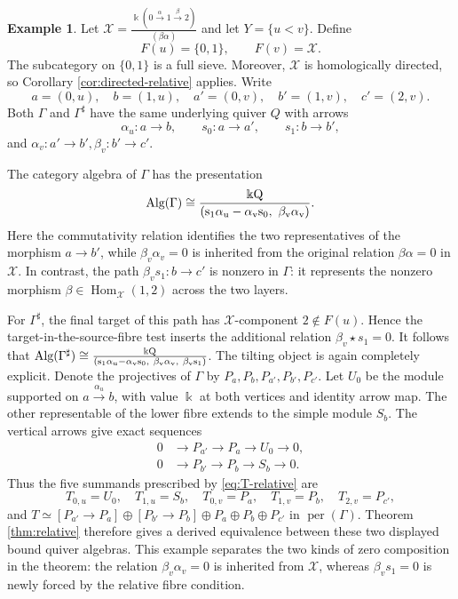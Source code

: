 \documentclass[12pt,a4paper,english,reqno]{amsart}
\theoremstyle{plain}
\theoremstyle{definition}
\newtheorem{exm}[theorem]{Example}
\newcommand{\kk}{\Bbbk}
\newcommand{\perf}{\operatorname{per}}
\newcommand{\Hom}{\operatorname{Hom}}
\newcommand{\X}{\mathcal X}
\newcommand{\G}{\Gamma}
\newcommand{\Gs}{\Gamma^{\sharp}}
\newcommand{\Alg}{\rm Alg}
\begin{document}
\begin{exm}
\label{ex:existing-zero-relation}
Let $\X=\frac{\kk(0\xrightarrow{\alpha}1\xrightarrow{\beta}2)}
             {(\beta\alpha)}$
and let $Y=\{u<v\}$.  Define
\[
 F(u)=\{0,1\},
 \qquad
 F(v)=\X.
\]
The subcategory on $\{0,1\}$ is a full sieve.  Moreover, $\X$ is
homologically directed, so Corollary \ref{cor:directed-relative} applies.
Write
\[
 a=(0,u),\quad b=(1,u),\quad
 a'=(0,v),\quad b'=(1,v),\quad c'=(2,v).
\]
Both $\G$ and $\Gs$ have the same underlying quiver $Q$ with arrows
\[
 \alpha_u:a\longrightarrow b,
 \qquad
 s_0:a\longrightarrow a',
 \qquad
 s_1:b\longrightarrow b',
\]
and $\alpha_v:a'\longrightarrow b',\beta_v:b'\longrightarrow c'$.

The category algebra of $\G$ has the presentation
\[
 \Alg(\G)
 \cong
 \frac{\kk Q}
 {(s_1\alpha_u-\alpha_vs_0,\ \beta_v\alpha_v)}.
\]
Here the commutativity relation identifies the two representatives of the
morphism $a\to b'$, while $\beta_v\alpha_v=0$ is inherited from the
original relation $\beta\alpha=0$ in $\X$.  In contrast, the path $\beta_vs_1:b\longrightarrow c'$
is nonzero in $\G$: it represents the nonzero morphism
$\beta\in\Hom_{\X}(1,2)$ across the two layers.

For $\Gs$, the final target of this path has $\X$-component
$2\notin F(u)$.  Hence the target-in-the-source-fibre test inserts the
additional relation $\beta_v\star s_1=0$.
It follows that $\Alg(\Gs)
 \cong
 \frac{\kk Q}
 {(s_1\alpha_u-\alpha_vs_0,\ \beta_v\alpha_v,\ \beta_vs_1)}$.
The tilting object is again completely explicit.  Denote the projectives of
$\G$ by $P_a,P_b,P_{a'},P_{b'},P_{c'}$.  Let $U_0$ be the module supported
on $a\xrightarrow{\alpha_u}b$, with value $\kk$ at both vertices and
identity arrow map.  The other representable of the lower fibre extends to
the simple module $S_b$.  The vertical arrows give exact sequences
\[
 \begin{aligned}
  0&\longrightarrow P_{a'}\longrightarrow P_a
       \longrightarrow U_0\longrightarrow0,\\
  0&\longrightarrow P_{b'}\longrightarrow P_b
       \longrightarrow S_b\longrightarrow0.
 \end{aligned}
\]
Thus the five summands prescribed by \eqref{eq:T-relative} are
\[
 T_{0,u}=U_0,
 \quad T_{1,u}=S_b,
 \quad T_{0,v}=P_a,
 \quad T_{1,v}=P_b,
 \quad T_{2,v}=P_{c'},
\]
and $T\simeq
 [P_{a'}\longrightarrow P_a]
 \oplus[P_{b'}\longrightarrow P_b]
 \oplus P_a\oplus P_b\oplus P_{c'}$ in $\perf(\G)$.
Theorem \ref{thm:relative} therefore gives a derived equivalence between
these two displayed bound quiver algebras.  This example separates the two
kinds of zero composition in the theorem: the relation
$\beta_v\alpha_v=0$ is inherited from $\X$, whereas
$\beta_vs_1=0$ is newly forced by the relative fibre condition.
\end{exm}
\end{document}
